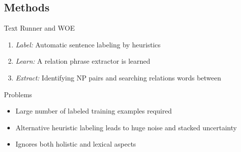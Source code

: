 \documentclass[11pt]{beamer}
\begin{document}
	\subsection{Methods}
		\begin{frame}{Text Runner and WOE}
			\begin{center}
				\begin{enumerate}
				\item \textit{Label:} Automatic sentence labeling by heuristics
				\item \textit{Learn:} A relation phrase extractor is learned
				\item \textit{Extract:} Identifying NP pairs and searching relations words between
				\end{enumerate}
			\end{center}
		\end{frame}
		\begin{frame}{Problems}
					\begin{center}
						\begin{itemize}
						\item Large number of labeled training examples required
						\item Alternative heuristic labeling leads to huge noise and stacked uncertainty
						\item Ignores both holistic and lexical aspects 
						\end{itemize}
					\end{center}
				\end{frame}
		
\end{document}

